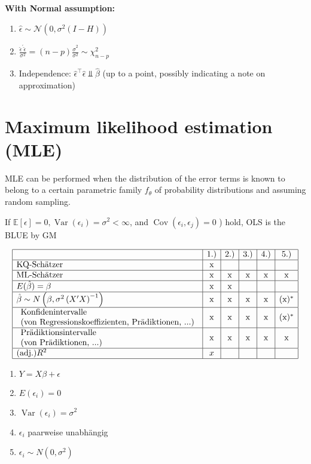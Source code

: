 \documentclass{article}
\begin{document}
\textbf{With Normal assumption:}
\begin{enumerate}
    \item $\hat{\epsilon} \sim \mathcal{N}(0, \sigma^2(I-H))$
    \item $\frac{\hat{\epsilon}^{\prime} \hat{\epsilon}}{\sigma^2} = (n-p) \frac{\hat{\sigma}^2}{\sigma^2} \sim \chi_{n-p}^2$
    \item Independence: $\hat{\epsilon}^{\top} \hat{\epsilon} \Perp \hat{\beta}$ (up to a point, possibly indicating a note on approximation)
\end{enumerate}

\section*{Maximum likelihood estimation (MLE)}
MLE can be performed when the distribution of the error terms is known to belong to a certain parametric family $f_\theta$ of probability distributions and assuming random sampling.

If $\mathbb{E}[\epsilon]=0, \operatorname{Var}(\epsilon_i)=\sigma^2<\infty$, and $\operatorname{Cov}(\epsilon_i, \epsilon_j)=0$ ) hold, OLS is the BLUE by GM

\[
\begin{array}{|l|c|c|c|c|c|}
\hline & \text{1.)} & \text{2.)} & \text{3.)} & \text{4.)} & \text{5.)} \\
\hline \text{KQ-Schätzer} & \mathrm{x} & & & & \\
\hline \text{ML-Schätzer} & \mathrm{x} & \mathrm{x} & \mathrm{x} & \mathrm{x} & \mathrm{x} \\
\hline E(\hat{\beta})=\beta & \mathrm{x} & \mathrm{x} & & & \\
\hline \hat{\beta} \sim N\left(\beta, \sigma^2\left(X^{\prime} X\right)^{-1}\right) & \mathrm{x} & \mathrm{x} & \mathrm{x} & \mathrm{x} & (\mathrm{x})^* \\
\hline \begin{array}{l}
\text{Konfidenintervalle} \\
\text{(von Regressionskoeffizienten, Prädiktionen, ...)}
\end{array} & \mathrm{x} & \mathrm{x} & \mathrm{x} & \mathrm{x} & (\mathrm{x})^* \\
\hline \begin{array}{l}
\text{Prädiktionsintervalle} \\
\text{(von Prädiktionen, ...)}
\end{array} & \mathrm{x} & \mathrm{x} & \mathrm{x} & \mathrm{x} & \mathrm{x} \\
\hline \text{(adj.)} R^2 & x & & & & \\
\hline
\end{array}
\]

\begin{enumerate}
    \item $Y=X \beta+\epsilon$
    \item $E\left(\epsilon_i\right)=0$
    \item $\operatorname{Var}\left(\epsilon_i\right)=\sigma^2$
    \item $\epsilon_i$ paarweise unabhängig
    \item $\epsilon_i \sim N\left(0, \sigma^2\right)$
\end{enumerate}
\end{document}
